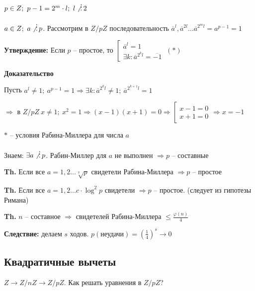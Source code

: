 \documentclass[14pt, letter paper]{article}
\begin{document}
$p \in Z;\ p - 1 = 2^m \cdot l;\ l \not\, \vdots \, 2$

$a \in Z;\ a \not\, \vdots \, p$. Рассмотрим в $Z/pZ$ последовательность $\overline{a}^l, \overline{a}^{2l} \ldots \overline{a}^{2^ml} = a^{p-1} = 1$

\textbf{Утверждение:} Если $p$ -- простое, то $\left[ \begin{gathered}
    \overline{a}^l = 1 \\
    \exists k : \overline{a}^{2^kl} = \overline{-1}
\end{gathered} \right.\ (*)$

\begin{center}
    \textbf{Доказательство}
\end{center}

Пусть $a^l \neq 1;\ a^{p-1} = 1 \Rightarrow \exists k : \overline{a}^{2^kl} \neq 1;\ \overline{a}^{2^{k+1}l} = 1$

$\Rightarrow$ в $Z/pZ\ x \neq 1;\ x^2 = 1 \Rightarrow (x-1)(x+1) = 0 \Rightarrow \left[ \begin{gathered}
    x - 1 = 0 \\
    x + 1 = 0
\end{gathered} \right. \Rightarrow x = -1$

$*$ -- условия Рабина-Миллера для числа $a$

Знаем: $\exists a \not\, \vdots \, p$. Рабин-Миллер для $a$ не выполнен $\Rightarrow p$ -- составные

\vspace{5mm}

\textbf{Th.} Если все $a = 1, 2 \ldots \sqrt[7]{p}$ свидетели Рабина-Миллера $\Rightarrow p$ -- простое

\textbf{Th.} Если все $a = 1, 2 \ldots c \cdot \log^2{p}$ свидетели $\Rightarrow p$ -- простое. (следует из гипотезы Римана)

\textbf{Th.} $n$ -- составное $\Rightarrow$ свидетелей Рабина-Миллера $\leq \frac{\varphi(n)}{4}$

\textbf{Следствие:} делаем $s$ ходов. $p(\text{неудачи}) = (\frac{1}{4})^s \rightarrow 0$

\begin{center}
    \section*{Квадратичные вычеты}
\end{center}

$Z \rightarrow Z/nZ \rightarrow Z/pZ$. Как решать уравнения в $Z/pZ$?
\end{document}
